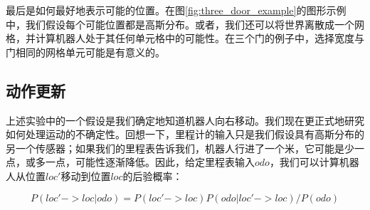 
最后是如何最好地表示可能的位置。在图\ref{fig:three_door_example}的图形示例中，我们假设每个可能位置都是高斯分布。或者，我们还可以将世界离散成一个网格，并计算机器人处于其任何单元格中的可能性。在三个门的例子中，选择宽度与门相同的网格单元可能是有意义的。


\subsection {动作更新}
上述实验中的一个假设是我们确定地知道机器人向右移动。我们现在更正式地研究如何处理运动的不确定性。回想一下，里程计的输入只是我们假设具有高斯分布的另一个传感器；如果我们的里程表告诉我们，机器人行进了一个米，它可能是少一点，或多一点，可能性逐渐降低。因此，给定里程表输入$odo$，我们可以计算机器人从位置$loc'$移动到位置$loc$的后验概率：

\begin{equation}
P(loc'->loc|odo)=P(loc'->loc)P(odo|loc'->loc)/P(odo)
\end{equation}


